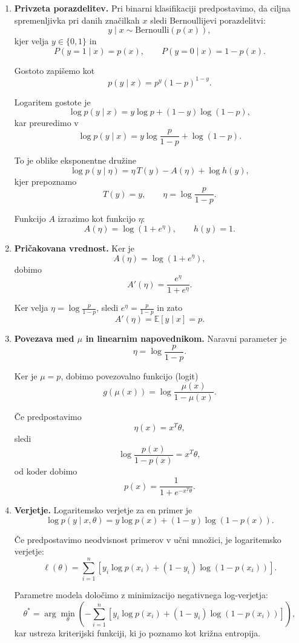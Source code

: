 \begin{enumerate}

\item \textbf{Privzeta porazdelitev.}
Pri binarni klasifikaciji predpostavimo, da ciljna spremenljivka
pri danih značilkah $x$ sledi Bernoullijevi porazdelitvi:
\[
y \mid x \sim \mathrm{Bernoulli}(p(x)),
\]
kjer velja $y \in \{0,1\}$ in
\[
P(y=1 \mid x) = p(x), \qquad P(y=0 \mid x) = 1 - p(x).
\]

Gostoto zapišemo kot
\[
p(y \mid x) = p^y (1-p)^{1-y}.
\]

Logaritem gostote je
\[
\log p(y \mid x) = y \log p + (1-y)\log(1-p),
\]
kar preuredimo v
\[
\log p(y \mid x)
= y \log \frac{p}{1-p} + \log(1-p).
\]

To je oblike eksponentne družine
\[
\log p(y \mid \eta)
= \eta\,T(y) - A(\eta) + \log h(y),
\]
kjer prepoznamo
\[
T(y)=y, \qquad
\eta = \log\frac{p}{1-p}.
\]

Funkcijo $A$ izrazimo kot funkcijo $\eta$:
\[
A(\eta) = \log(1 + e^\eta), \qquad h(y)=1.
\]

\item \textbf{Pričakovana vrednost.} Ker je
\[
A(\eta) = \log(1 + e^\eta),
\]
dobimo
\[
A'(\eta) = \frac{e^\eta}{1 + e^\eta}.
\]

Ker velja $\eta = \log\frac{p}{1-p}$, sledi $e^\eta = \frac{p}{1-p}$ in zato
\[
A'(\eta) = \mathbb{E}[y \mid x] = p.
\]

\item \textbf{Povezava med $\mu$ in linearnim napovednikom.}
Naravni parameter je
\[
\eta = \log \frac{p}{1-p}.
\]

Ker je $\mu = p$, dobimo povezovalno funkcijo (logit)
\[
g(\mu(x)) = \log \frac{\mu(x)}{1-\mu(x)}.
\]

Če predpostavimo
\[
\eta(x) = x^T\theta,
\]
sledi
\[
\log \frac{p(x)}{1-p(x)} = x^T\theta,
\]
od koder dobimo
\[
p(x) = \frac{1}{1 + e^{-x^T\theta}}.
\]

\item \textbf{Verjetje.}
Logaritemsko verjetje za en primer je
\[
\log p(y \mid x, \theta)
= y \log p(x) + (1-y)\log(1-p(x)).
\]

Če predpostavimo neodvisnost primerov v učni množici, je logaritemsko verjetje:
\[
\ell(\theta)
= \sum_{i=1}^n \left[
y_i \log p(x_i) + (1-y_i)\log(1-p(x_i))
\right].
\]

Parametre modela določimo z minimizacijo negativnega log-verjetja:
\[
\theta^*
=
\arg\min_\theta
\left(
-\sum_{i=1}^n \left[
y_i \log p(x_i) + (1-y_i)\log(1-p(x_i))
\right]
\right),
\]
kar ustreza kriterijski funkciji, ki jo poznamo kot križna entropija.

\end{enumerate}

